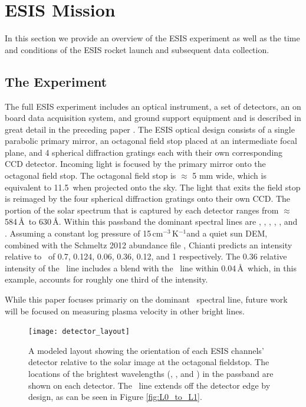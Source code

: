 \section{ESIS Mission}

In this section we provide an overview of the ESIS experiment as well as the time and conditions of the ESIS rocket launch and subsequent data collection.   

	\subsection{The Experiment}
	  	
    	The full ESIS experiment includes an optical instrument, a set of detectors, an on board data acquisition system, and ground support equipment and is described in great detail in the preceding paper \citep{ESIS}.
    	The ESIS optical design consists of a single parabolic primary mirror, an octagonal field stop placed at an intermediate focal plane, and 4 spherical diffraction gratings each with their own corresponding CCD detector.
    	Incoming light is focused by the primary mirror onto the octagonal field stop. 
    	The octagonal field stop is $\approx$ 5 mm wide, which is equivalent to %
    	11.5\arcmin \  when projected onto the sky. 
    	The light that exits the field stop is reimaged  by the four spherical diffraction gratings onto their own CCD.
    	The portion of the solar spectrum that is captured by each detector ranges from $\approx$ 584\,\AA \ to 630\,\AA. 
    	Within this passband the dominant spectral lines are \hei, \oiii, \oiv, \mgxbright, \mgxdim, and \ov.
    	Assuming a constant log pressure of 15\,cm$^{-3}$\,K$^{-1}$and a quiet sun DEM, combined with the Schmeltz 2012 abundance file \citep{schmelz2012}, Chianti \citep{ChiantiI,ChiantiX} predicts an intensity relative to \ov \ of 0.7, 0.124, 0.06, 0.36, 0.12, and 1 respectively.
    	The 0.36 relative intensity of the \mgxbright \ line includes a blend with %
    	the \oivTwo \ line within 0.04\,\AA\ which, in this example, accounts for roughly one third of the intensity.
    	
    	While this paper focuses primariy on the dominant \ov \ spectral line, future work will be focused on measuring plasma velocity in other bright lines. %

    	
        \begin{figure}[ht]
			\begin{center}
				\texttt{[image: detector\_layout]}
				\caption{A modeled layout showing the orientation of each ESIS channels' detector relative to the solar image at the octagonal fieldstop.  The locations of the brightest wavelengths (\hei, \mgxbright, and \ov) in the passband are shown on each detector.  The \hei \ line  extends off the detector edge by design, as can be seen in Figure \ref{fig:L0_to_L1}. }
				\label{fig:level_1_array}
			\end{center}
		\end{figure}


